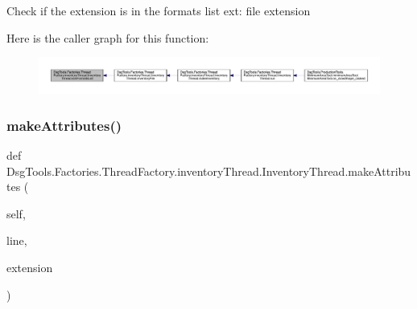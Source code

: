 \begin{DoxyVerb}Check if the extension is in the formats list
ext: file extension
\end{DoxyVerb}
 Here is the caller graph for this function\+:
\nopagebreak
\begin{figure}[H]
\begin{center}
\leavevmode
\includegraphics[width=350pt]{class_dsg_tools_1_1_factories_1_1_thread_factory_1_1inventory_thread_1_1_inventory_thread_a2b836f05fa0564687851b4c400121a81_icgraph}
\end{center}
\end{figure}
\mbox{\label{class_dsg_tools_1_1_factories_1_1_thread_factory_1_1inventory_thread_1_1_inventory_thread_ab72bc1372d558d3938a4ee94ff245c0a}} 
\subsubsection{\texorpdfstring{make\+Attributes()}{makeAttributes()}}
{\footnotesize\ttfamily def Dsg\+Tools.\+Factories.\+Thread\+Factory.\+inventory\+Thread.\+Inventory\+Thread.\+make\+Attributes (\begin{DoxyParamCaption}\item[{}]{self,  }\item[{}]{line,  }\item[{}]{extension }\end{DoxyParamCaption})}

